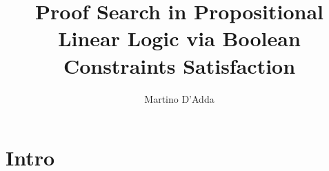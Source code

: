 \documentclass[a4paper, 12pt, english]{report}
\title{Proof Search in Propositional Linear Logic via Boolean Constraints Satisfaction
}
\author{Martino D'Adda}
\date{}
\begin{document}
\maketitle
\newpage
\tableofcontents
\newpage


\chapter{Intro}
% 
% 
% 
% 
\end{document}
